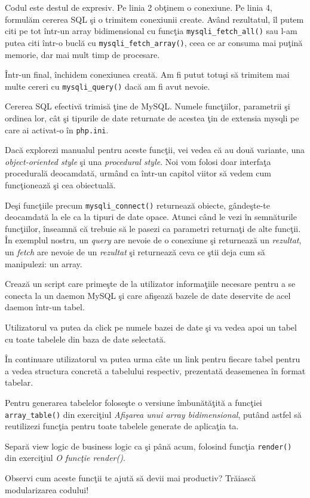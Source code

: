 

Codul este destul de expresiv. Pe linia 2 obţinem o conexiune.
Pe linia 4, formulăm cererea SQL şi o trimitem conexiunii create.
Având rezultatul, îl putem citi pe tot într-un array bidimensional
cu funcţia \texttt{mysqli\_fetch\_all()} sau l-am putea citi într-o
buclă cu \texttt{mysqli\_fetch\_array()}, ceea ce ar consuma
mai puţină memorie, dar mai mult timp de procesare.

Într-un final, închidem conexiunea creată. Am fi putut totuşi să
trimitem mai multe cereri cu \texttt{mysqli\_query()} dacă am fi
avut nevoie.

Cererea SQL efectivă trimisă ţine de MySQL. Numele funcţiilor,
parametrii şi ordinea lor, cât şi tipurile de date returnate de
acestea ţin de extensia mysqli pe care ai activat-o în \texttt{php.ini}.

Dacă explorezi manualul pentru aceste funcţii, vei vedea că au
două variante, una \textit{object-oriented style} şi una
\textit{procedural style}. Noi vom folosi doar interfaţa procedurală
deocamdată, urmând ca într-un
capitol viitor să vedem cum funcţionează şi cea obiectuală.

Deşi funcţiile precum \texttt{mysqli\_connect()} returnează obiecte,
gândeşte-te deocamdată la ele ca la tipuri de date opace.
Atunci când le vezi în semnăturile funcţiilor, înseamnă că trebuie
să le pasezi ca parametri returnaţi de alte funcţii. În exemplul
nostru, un \textit{query} are nevoie de o conexiune şi returnează
un \textit{rezultat}, un \textit{fetch} are nevoie de un \textit{rezultat}
şi returnează ceva ce ştii deja cum să manipulezi: un array.

\begin{Exercise}[title={Databases explorer}]
Crează un script care primeşte de la utilizator informaţiile necesare
pentru a se conecta la un daemon MySQL şi care afişează bazele
de date deservite de acel daemon într-un tabel.

Utilizatorul va putea da click pe numele bazei de date şi va vedea
apoi un tabel cu toate tabelele din baza de date selectată.

În continuare utilizatorul va putea urma câte un link pentru fiecare
tabel pentru a vedea structura concretă a tabelului respectiv,
prezentată deasemenea în format tabelar.

Pentru generarea tabelelor foloseşte o versiune îmbunătăţită a funcţiei
\texttt{array\_table()} din exerciţiul \textit{Afişarea unui array
bidimensional}, putând astfel să reutilizezi funcţia pentru
toate tabelele generate de aplicaţia ta.

Separă view logic de business logic ca şi până acum, folosind funcţia
\texttt{render()} din exerciţiul \textit{O funcţie render()}.

Observi cum aceste funcţii te ajută să devii mai productiv? Trăiască
modularizarea codului!
\end{Exercise}

